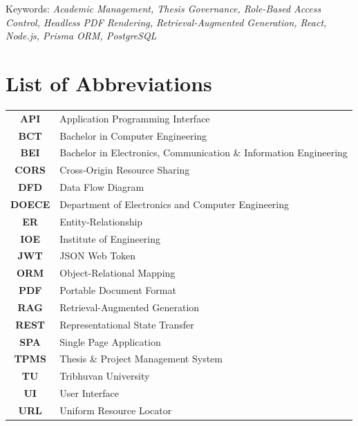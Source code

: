 \documentclass[12pt]{report}
\begin{document}
\newline
Keywords: \textit{Academic Management, Thesis Governance, Role-Based Access Control, Headless PDF Rendering, Retrieval-Augmented Generation, React, Node.js, Prisma ORM, PostgreSQL}

\tableofcontents
{}
\listoffigures
{}
\listoftables
{}

\chapter*{List of Abbreviations}
\begin{tabular}{c l}
\textbf{API}      & Application Programming Interface\\
\textbf{BCT}      & Bachelor in Computer Engineering\\
\textbf{BEI}      & Bachelor in Electronics, Communication \& Information Engineering\\
\textbf{CORS}     & Cross-Origin Resource Sharing\\
\textbf{DFD}      & Data Flow Diagram\\
\textbf{DOECE}    & Department of Electronics and Computer Engineering\\
\textbf{ER}       & Entity-Relationship\\
\textbf{IOE}      & Institute of Engineering\\
\textbf{JWT}      & JSON Web Token\\
\textbf{ORM}      & Object-Relational Mapping\\
\textbf{PDF}      & Portable Document Format\\
\textbf{RAG}      & Retrieval-Augmented Generation\\
\textbf{REST}     & Representational State Transfer\\
\textbf{SPA}      & Single Page Application\\
\textbf{TPMS}     & Thesis \& Project Management System\\
\textbf{TU}       & Tribhuvan University\\
\textbf{UI}       & User Interface\\
\textbf{URL}      & Uniform Resource Locator
\end{tabular}
\end{document}
